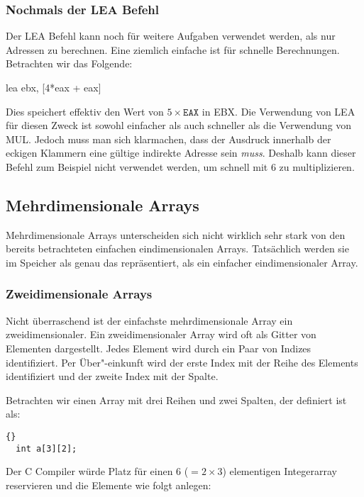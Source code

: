 \subsubsection{Nochmals der {\code LEA} Befehl}

Der {\code LEA} Befehl kann noch f\"{u}r weitere Aufgaben verwendet
werden, als nur Adressen zu berechnen. Eine ziemlich einfache ist
f\"{u}r schnelle Berechnungen. Betrachten wir das Folgende:
\begin{AsmCodeListing}[numbers=none, frame=none]
      lea    ebx, [4*eax + eax]
\end{AsmCodeListing}
Dies speichert effektiv den Wert von $5 \times \mathtt{EAX}$ in
{\code EBX}\@. Die Verwendung von {\code LEA} f\"{u}r diesen Zweck ist
sowohl einfacher als auch schneller als die Verwendung von {\code
MUL}\@.  Jedoch muss man sich klarmachen,
dass der Ausdruck innerhalb der eckigen Klammern eine g\"{u}ltige
indirekte Adresse sein \emph{muss}. Deshalb kann dieser Befehl zum
Beispiel nicht verwendet werden, um schnell mit 6 zu multiplizieren.


\subsection{Mehrdimensionale Arrays}

Mehrdimensionale Arrays unterscheiden sich nicht wirklich sehr stark
von den bereits betrachteten einfachen eindimensionalen Arrays.
Tats\"{a}chlich werden sie im Speicher als genau das repr\"{a}sentiert, als
ein einfacher eindimensionaler Array.

\subsubsection{Zweidimensionale Arrays}
Nicht \"{u}berraschend ist der einfachste mehrdimensionale Array ein
zweidimensionaler. Ein zweidimensionaler Array wird oft als Gitter
von Elementen dargestellt. Jedes Element wird durch ein Paar von
Indizes identifiziert. Per \"{U}ber"-einkunft wird der erste Index mit
der Reihe des Elements identifiziert und der zweite Index mit der
Spalte.

Betrachten wir einen Array mit drei Reihen und zwei Spalten, der
definiert ist als:
\begin{lstlisting}[stepnumber=0]{}
  int a[3][2];
\end{lstlisting}
Der C Compiler w\"{u}rde Platz f\"{u}r einen 6 ($= 2 \times 3$) elementigen
Integerarray reservieren und die Elemente wie folgt anlegen:

